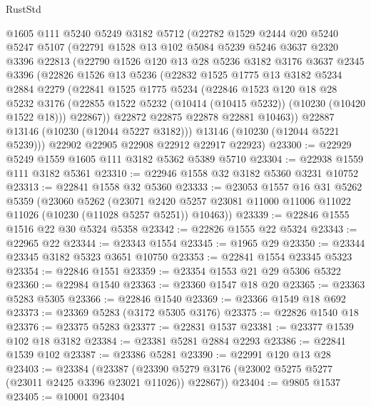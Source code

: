 \begin{lexlean}{RustStd}
\begin{coremodule}
    @1605
    @111
    @5240
    @5249
    @3182
    @5712
    (@22782
      @1529
      @2444
      @20
      @5240
      @5247
      @5107
      (@22791
        @1528
        @13
        @102
        @5084
        @5239
        @5246
        @3637
        @2320
        @3396
        @22813
        (@22790
          @1526
          @120
          @13
          @28
          @5236
          @3182
          @3176
          @3637
          @2345
          @3396
          (@22826
            @1526
            @13
            @5236
            (@22832
              @1525
              @1775
              @13
              @3182
              @5234
              @2884
              @2279
              (@22841
                @1525
                @1775
                @5234
                (@22846
                  @1523
                  @120
                  @18
                  @28
                  @5232
                  @3176
                  (@22855 @1522 @5232 (@10414 (@10415 @5232)) (@10230 (@10420 @1522 @18)))
                  @22867))
              @22872
              @22875
              @22878
              @22881
              @10463))
          @22887
          @13146
          (@10230 (@12044 @5227 @3182)))
        @13146
        (@10230 (@12044 @5221 @5239)))
      @22902
      @22905
      @22908
      @22912
      @22917
      @22923)
@23300 := @22929 @5249 @1559 @1605 @111 @3182 @5362 @5389 @5710
@23304 := @22938 @1559 @111 @3182 @5361
@23310 := @22946 @1558 @32 @3182 @5360 @3231 @10752
@23313 := @22841 @1558 @32 @5360
@23333 := @23053
    @1557
    @16
    @31
    @5262
    @5359
    (@23060
      @5262
      (@23071 @2420 @5257 @23081 @11000 @11006 @11022 @11026 (@10230 (@11028 @5257 @5251)) @10463))
@23339 := @22846 @1555 @1516 @22 @30 @5324 @5358
@23342 := @22826 @1555 @22 @5324
@23343 := @22965 @22
@23344 := @23343 @1554
@23345 := @1965 @29
@23350 := @23344 @23345 @3182 @5323 @3651 @10750
@23353 := @22841 @1554 @23345 @5323
@23354 := @22846 @1551
@23359 := @23354 @1553 @21 @29 @5306 @5322
@23360 := @22984 @1540
@23363 := @23360 @1547 @18 @20
@23365 := @23363 @5283 @5305
@23366 := @22846 @1540
@23369 := @23366 @1549 @18 @692
@23373 := @23369 @5283 (@3172 @5305 @3176)
@23375 := @22826 @1540 @18
@23376 := @23375 @5283
@23377 := @22831 @1537
@23381 := @23377 @1539 @102 @18 @3182
@23384 := @23381 @5281 @2884 @2293
@23386 := @22841 @1539 @102
@23387 := @23386 @5281
@23390 := @22991 @120 @13 @28
@23403 := @23384
    (@23387 (@23390 @5279 @3176 (@23002 @5275 @5277 (@23011 @2425 @3396 @23021 @11026)) @22867))
@23404 := @9805 @1537
@23405 := @10001 @23404

\end{coremodule}
\end{lexlean}
